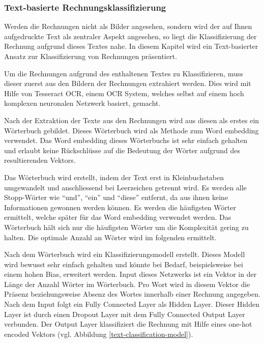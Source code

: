 \subsubsection{Text-basierte Rechnungsklassifizierung}
\label{chap:text-based-classification}


Werden die Rechnungen nicht als Bilder angesehen, sondern wird der auf Ihnen aufgedruckte Text als zentraler Aspekt angesehen, so liegt die Klassifizierung der Rechnung aufgrund dieses Textes nahe. In diesem Kapitel wird ein Text-basierter Ansatz zur Klassifizierung von Rechnungen präsentiert. 

Um die Rechnungen aufgrund des enthaltenen Textes zu Klassifizieren, muss dieser zuerst aus den Bildern der Rechnungen extrahiert werden. Dies wird mit Hilfe von Tesseract OCR, einem OCR System, welches selbst auf einem hoch komplexen neuronalen Netzwerk basiert, gemacht.

Nach der Extraktion der Texte aus den Rechnungen wird aus diesen als erstes ein Wörterbuch gebildet. Dieses Wörterbuch wird als Methode zum Word embedding verwendet. Das Word embedding dieses Wörterbuchs ist sehr einfach gehalten und erlaubt keine Rückschlüsse auf die Bedeutung der Wörter aufgrund des resultierenden Vektors.

Das Wörterbuch wird erstellt, indem der Text erst in Kleinbuchstaben umgewandelt und anschliessend bei Leerzeichen getrennt wird. Es werden alle Stopp-Wörter wie \enquote{und}, \enquote{ein} und \enquote{diese} entfernt, da aus ihnen keine Informationen gewonnen werden können. Es werden die häufigsten Wörter ermittelt, welche später für das Word embedding verwendet werden. Das Wörterbuch hält sich nur die häufigsten Wörter um die Komplexität gering zu halten. Die optimale Anzahl an Wörter wird im folgenden ermittelt.

Nach dem Wörterbuch wird ein Klassifizierungsmodell erstellt. Dieses Modell wird bewusst sehr einfach gehalten und könnte bei Bedarf, beispielsweise bei einem hohen Bias, erweitert werden. Input dieses Netzwerks ist ein Vektor in der Länge der Anzahl Wörter im Wörterbuch. Pro Wort wird in diesem Vektor die Präsenz beziehungsweise Absenz des Wortes innerhalb einer Rechnung angegeben. Nach dem Input folgt ein Fully Connected Layer als Hidden Layer. Dieser Hidden Layer ist durch einen Dropout Layer mit dem Fully Connected Output Layer verbunden. Der Output Layer klassifiziert die Rechnung mit Hilfe eines one-hot encoded Vektors (vgl. Abbildung \ref{text-classification-model}). 

